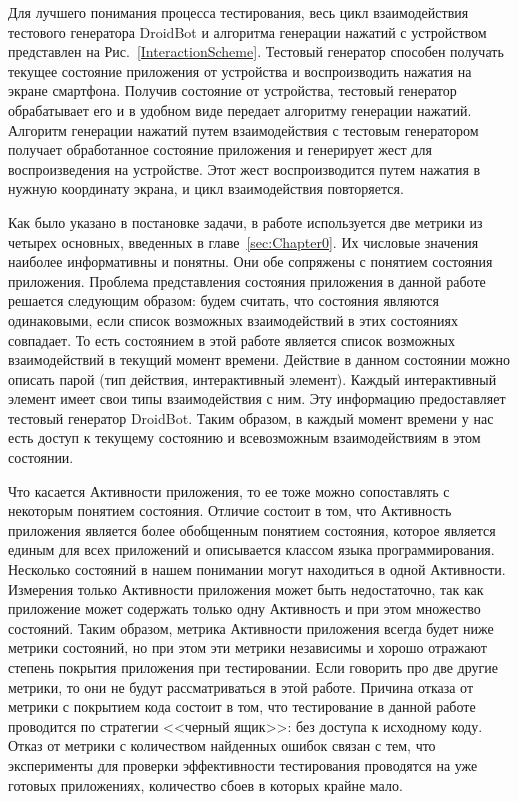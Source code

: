 Для лучшего понимания процесса тестирования, весь цикл взаимодействия тестового генератора DroidBot и алгоритма генерации нажатий с устройством представлен на Рис.~\ref{InteractionScheme}. Тестовый генератор способен получать текущее состояние приложения от устройства и воспроизводить нажатия на экране смартфона. Получив состояние от устройства, тестовый генератор обрабатывает его и в удобном виде передает алгоритму генерации нажатий.  Алгоритм генерации нажатий путем взаимодействия с тестовым генератором получает обработанное состояние приложения и генерирует жест для воспроизведения на устройстве. Этот жест воспроизводится путем нажатия в нужную координату экрана, и цикл взаимодействия повторяется.

Как было указано в постановке задачи, в работе используется две метрики из четырех основных, введенных в главе~\ref{sec:Chapter0}. Их числовые значения наиболее информативны и понятны. Они обе сопряжены с понятием состояния приложения. Проблема представления состояния приложения в данной работе решается следующим образом: будем считать, что состояния являются одинаковыми, если список возможных взаимодействий в этих состояниях совпадает. То есть состоянием в этой работе является список возможных взаимодействий в текущий момент времени. Действие в данном состоянии можно описать парой (тип действия, интерактивный элемент). Каждый интерактивный элемент имеет свои типы взаимодействия с ним. Эту информацию предоставляет тестовый генератор DroidBot. Таким образом, в каждый момент времени у нас есть доступ к текущему состоянию и всевозможным взаимодействиям в этом состоянии.

Что касается Активности приложения, то ее тоже можно сопоставлять с некоторым понятием состояния. Отличие состоит в том, что Активность приложения является более обобщенным понятием состояния, которое является единым для всех приложений и описывается классом языка программирования. Несколько состояний в нашем понимании могут находиться в одной Активности. Измерения только Активности приложения может быть недостаточно, так как приложение может содержать только одну Активность и при этом множество состояний. Таким образом, метрика Активности приложения всегда будет ниже метрики состояний, но при этом эти метрики независимы и хорошо отражают степень покрытия приложения при тестировании. Если говорить про две другие метрики, то они не будут рассматриваться в этой работе. Причина отказа от метрики с покрытием кода состоит в том, что тестирование в данной работе проводится по стратегии <<черный ящик>>: без доступа к исходному коду. Отказ от метрики с количеством найденных ошибок связан с тем, что эксперименты для проверки эффективности тестирования проводятся на уже готовых приложениях, количество сбоев в которых крайне мало.

